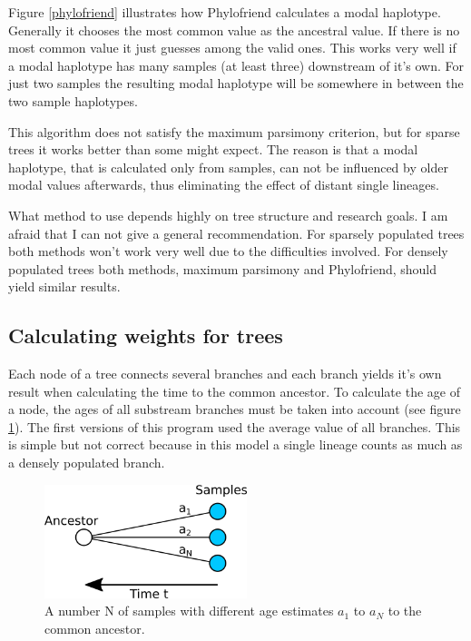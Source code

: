 Figure \ref{phylofriend} illustrates how Phylofriend calculates
a modal haplotype. Generally it chooses the most common value
as the ancestral value. If there is no most common value it
just guesses among the valid ones. This works very well if
a modal haplotype has many samples (at least three) downstream
of it's own. For just two samples the resulting modal haplotype
will be somewhere in between the two sample haplotypes.

This algorithm does not satisfy the maximum parsimony criterion,
but for sparse trees it works better than some might expect.
The reason is that a modal haplotype, that is calculated only
from samples, can not be influenced by older modal values afterwards,
thus eliminating the effect of distant single lineages.

What method to use depends highly on tree structure and
research goals. I am afraid that I can not give a general
recommendation. For sparsely populated trees both methods won't
work very well due to the difficulties involved.
For densely populated trees both methods, maximum parsimony
and Phylofriend, should yield similar results.


\subsection{\label{section_weights}Calculating weights for trees}

Each node of a tree connects several branches and each branch
yields it's own result when calculating the time to the common
ancestor. To calculate the age of a node, the ages of all substream
branches must be taken into account (see figure \ref{weights}).
The first versions of this
program used the average value of all branches. This is simple
but not correct because in this model a single lineage counts as
much as a densely populated branch.

\begin{figure}[ht]
\centering
\includegraphics[width=5.9cm]{img/weights.png}
\caption{\label{weights} A number N of samples with different age
estimates $a_1$ to $a_N$ to the common ancestor.}
\end{figure}

